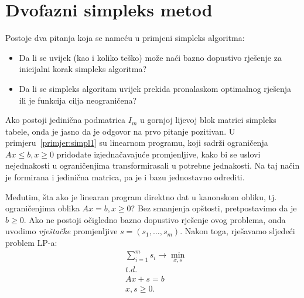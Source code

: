\documentclass[a4paper, utf8, 11pt, colorlinks]{book}
\theoremstyle{definition}
\begin{document}
 \section{Dvofazni simpleks metod}
 Postoje dva pitanja koja se nameću u primjeni simpleks algoritma:
 \begin{itemize}
     \item Da li se uvijek (kao i koliko teško)   može naći bazno dopustivo rješenje za inicijalni korak 
     simpleks algoritma?
     \item Da li se simpleks algoritam uvijek prekida pronalaskom optimalnog rješenja ili je funkcija cilja neograničena?
 \end{itemize}
Ako postoji jedinična podmatrica $I_m$ u gornjoj lijevoj blok matrici simpleks tabele, onda je jasno da je odgovor na prvo pitanje pozitivan. U primjeru~\ref{primjer:simpl1} su linearnom programu, koji sadrži ograničenja $Ax \leq b, x\geq 0$ pridodate izjednačavajuće promjenljive, kako bi se uslovi nejednakosti u ograničenjima transformirasali u potrebne jednakosti.  Na taj način je formirana i jedinična matrica, pa je i bazu jednostavno odrediti.
 
 
 Međutim, šta ako je linearan program direktno dat u kanonskom obliku, tj. ograničenjima oblika $Ax = b, x \geq 0$? Bez smanjenja opštosti, pretpostavimo da je $b \geq 0$. Ako ne postoji očigledno bazno dopustivo rješenje ovog problema, onda uvodimo \emph{vještačke} promjenljive $s = (s_1,\ldots, s_m)$. Nakon toga, rješavamo sljedeći problem LP-a:
 \begin{align}
      &\sum_{i=1}^m s_i \rightarrow \min_{x,s} \nonumber \\
      & {t.d.}\label{eq:artificial_lp_simplex}\\
      & A x + s = b \nonumber \\
      &  x, s \geq 0. \nonumber
 \end{align}
  
\end{document}
